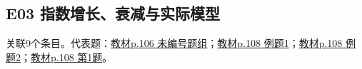 \par\medskip\noindent\begin{minipage}{\linewidth}\subsection{E03 指数增长、衰减与实际模型}关联9个条目。代表题：\hyperref[XJ-B1-C04-TH-P106-Y0720]{教材p.106 未编号题组}；\hyperref[XJ-B1-C04-EX-P108-Y0177]{教材p.108 例题1}；\hyperref[XJ-B1-C04-EX-P108-Y0840]{教材p.108 例题2}；\hyperref[XJ-B1-C04-PR-P108-Y1273]{教材p.108 第1题}。\end{minipage}\par

